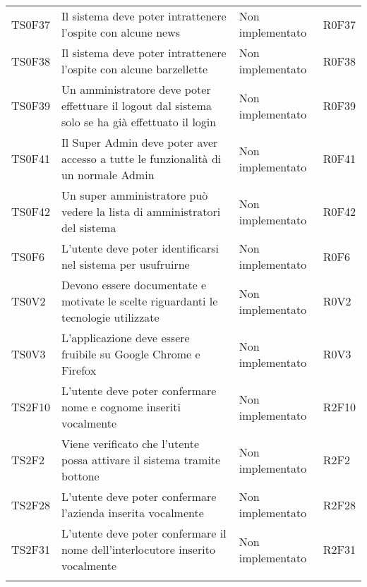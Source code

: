\documentclass[../PianoDiQualifica.tex]{subfiles}
\begin{document}
\begin{longtable}[c] { >{\centering\arraybackslash}p{2cm} p{7cm} >{\centering\arraybackslash}p{4cm} >{\centering\arraybackslash}p{2cm}}
			\addlinespace[0.3em]
			\midrule
			\addlinespace[0.3em]
			TS0F37 & Il sistema deve poter intrattenere l'ospite con alcune news & Non implementato & R0F37 \\ 
			\addlinespace[0.3em]
			\midrule
			\addlinespace[0.3em]
			TS0F38 & Il sistema deve poter intrattenere l'ospite con alcune barzellette & Non implementato & R0F38 \\ 
			\addlinespace[0.3em]
			\midrule
			\addlinespace[0.3em]
			TS0F39 & Un amministratore deve poter effettuare il logout dal sistema solo se ha già  effettuato il login & Non implementato & R0F39 \\ 
			\addlinespace[0.3em]
			\midrule
			\addlinespace[0.3em]
			TS0F41 & Il Super Admin deve poter aver accesso a tutte le funzionalità  di un normale Admin	 & Non implementato & R0F41 \\ 
			\addlinespace[0.3em]
			\midrule
			\addlinespace[0.3em]
			TS0F42 & Un super amministratore può vedere la lista di amministratori del sistema & Non implementato & R0F42 \\ 
			\addlinespace[0.3em]
			\midrule
			\addlinespace[0.3em]
			TS0F6 & L'utente deve poter identificarsi nel sistema per usufruirne & Non implementato & R0F6 \\ 
			\addlinespace[0.3em]
			\midrule
			\addlinespace[0.3em]
			TS0V2 & Devono essere documentate e motivate le scelte riguardanti le tecnologie utilizzate & Non implementato & R0V2 \\ 
			\addlinespace[0.3em]
			\midrule
			\addlinespace[0.3em]
			TS0V3 & L'applicazione deve essere fruibile su Google Chrome e Firefox & Non implementato & R0V3 \\ 
			\addlinespace[0.3em]
			\midrule
			\addlinespace[0.3em]
			TS2F10 & L'utente deve poter confermare nome e cognome inseriti vocalmente & Non implementato & R2F10 \\ 
			\addlinespace[0.3em]
			\midrule
			\addlinespace[0.3em]
			TS2F2 & Viene verificato che l'utente possa attivare il sistema tramite bottone & Non implementato & R2F2 \\ 
			\addlinespace[0.3em]
			\midrule
			\addlinespace[0.3em]
			TS2F28 & 	L'utente deve poter confermare l'azienda inserita vocalmente & Non implementato & R2F28 \\ 
			\addlinespace[0.3em]
			\midrule
			\addlinespace[0.3em]
			TS2F31 & L'utente deve poter confermare il nome dell'interlocutore inserito vocalmente	 & Non implementato & R2F31 \\ 
			\addlinespace[0.3em]

\end{longtable}
\end{document}

